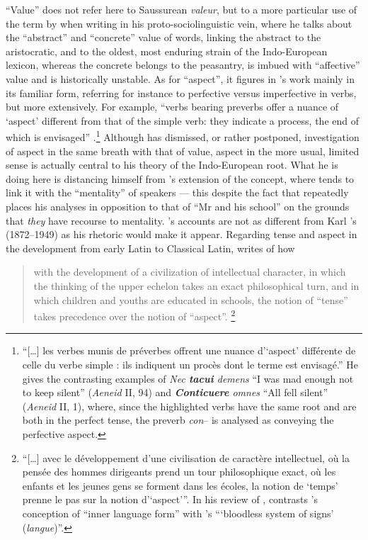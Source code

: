 \documentclass[output=paper]{langscibook}
\begin{document}
``Value'' does not refer here to Saussurean \emph{valeur}, but to a more particular use of the term by {\Meillet} when writing in his proto-sociolinguistic vein, where he talks about the ``abstract'' and ``concrete'' value of words, linking the abstract to the aristocratic, and to the oldest, most enduring strain of the Indo-European lexicon, whereas the concrete belongs to the peasantry, is imbued with ``affective'' value and is historically unstable. As for ``aspect'', it figures in {\Meillet}'s work mainly in its familiar form, referring for instance to perfective versus imperfective in verbs, but more extensively. For example, ``verbs bearing preverbs offer a nuance of `aspect' different from that of the simple verb: they indicate a process, the end of which is envisaged'' \citep[263--264]{Meillet1931}.\footnote{``[…] les verbes munis de préverbes offrent une nuance d’`aspect' différente de celle du verbe simple : ils indiquent un procès dont le terme est envisagé.'' He gives the contrasting examples of \emph{Nec \textbf{tacui} demens} ``I was mad enough not to keep silent'' (\emph{Aeneid} II, 94) and \emph{\textbf{Conticuere} omnes} ``All fell silent'' (\emph{Aeneid} II, 1), where, since the highlighted verbs have the same root and are both in the perfect tense, the preverb \emph{con}-- is analysed as conveying the perfective aspect.} Although {\Benveniste} has dismissed, or rather postponed, investigation of aspect in the same breath with that of value, aspect in the more usual, limited sense is actually central to his theory of the Indo-European root. What he is doing here is distancing himself from {\Meillet}'s extension of the concept, where {\Meillet} tends to link it with the ``mentality'' of speakers — this despite the fact that {\Meillet} repeatedly places his analyses in opposition to that of ``Mr {\Vossler} and his school'' on the grounds that \emph{they} have recourse to mentality. {\Meillet}'s accounts are not as different from Karl {\Vossler}'s (1872--1949) as his rhetoric would make it appear. Regarding tense and aspect in the development from early Latin to Classical Latin, {\Meillet} writes of how

\begin{quotation}
with the development of a civilization of intellectual character, in which the thinking of the upper echelon takes an exact philosophical turn, and in which children and youths are educated in schools, the notion of ``tense'' takes precedence over the notion of ``aspect''. \citep[270--271]{Meillet1931}\footnote{``[…] avec le développement d'une civilisation de caractère intellectuel, où la pensée des hommes dirigeants prend un tour philosophique exact, où les enfants et les jeunes gens se forment dans les écoles, la notion de `temps' prenne le pas sur la notion d'`aspect'\thinspace''. In his review of \citet{Vossler1932}, \citet[234]{Firth1933} contrasts {\Vossler}'s conception of ``inner language form'' with {\Saussure}'s ```bloodless system of signs' (\emph{langue})''.}
\end{quotation}
\end{document}
